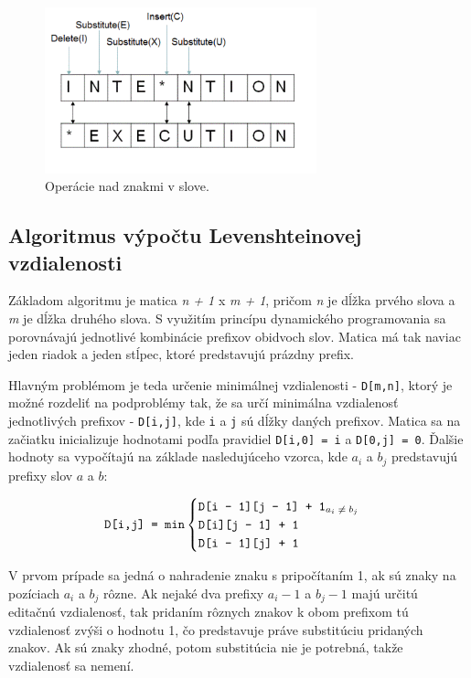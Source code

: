 \documentclass[
  digital, %
  table,   %
  lof,     %
  lot,     %
]{fithesis3}
\begin{document}
\begin{figure}
	\begin{center}
	\includegraphics[width=0.7\textwidth]{img/distance.png}
	\end{center}
    \caption{Operácie nad znakmi v slove.}
	\label{fig:levenshtein}
\end{figure}

\subsection{Algoritmus výpočtu Levenshteinovej vzdialenosti}
Základom algoritmu je matica \textit{n + 1} x \textit{m + 1}, pričom \textit{n} je dĺžka prvého slova a \textit{m} je dĺžka druhého slova. S využitím princípu dynamického programovania sa porovnávajú jednotlivé kombinácie prefixov obidvoch slov. Matica má tak naviac jeden riadok a jeden stĺpec, ktoré predstavujú prázdny prefix.

Hlavným problémom je teda určenie minimálnej vzdialenosti - \texttt{D[m,n]}, ktorý je možné rozdeliť na podproblémy tak, že sa určí minimálna vzdialenosť jednotlivých prefixov - \texttt{D[i,j]}, kde \texttt{i} a \texttt{j} sú dĺžky daných prefixov. Matica sa na začiatku inicializuje hodnotami podľa pravidiel \texttt{D[i,0] = i} a \texttt{D[0,j] = 0}. Ďalšie hodnoty sa vypočítajú na základe nasledujúceho vzorca, kde $a_i$ a $b_j$ predstavujú prefixy slov $a$ a $b$:

 \begin{equation}
 \texttt{D[i,j] = min}\begin{cases}
       \texttt{D[i - 1][j - 1] + 1\textsubscript{$a_i \neq b_j$}} \\
       \texttt{D[i][j - 1] + 1} \\
       \texttt{D[i - 1][j] + 1}
       \end{cases}
 \end{equation}

V prvom prípade sa jedná o nahradenie znaku s pripočítaním 1, ak sú znaky na pozíciach $a_i$ a $b_j$ rôzne. Ak nejaké dva prefixy $a_i-1$ a $b_j-1$ majú určitú editačnú vzdialenosť, tak pridaním rôznych znakov k obom prefixom tú vzdialenosť zvýši o hodnotu 1, čo predstavuje práve substitúciu pridaných znakov. Ak sú znaky zhodné, potom substitúcia nie je potrebná, takže vzdialenosť sa nemení. 
\end{document}
